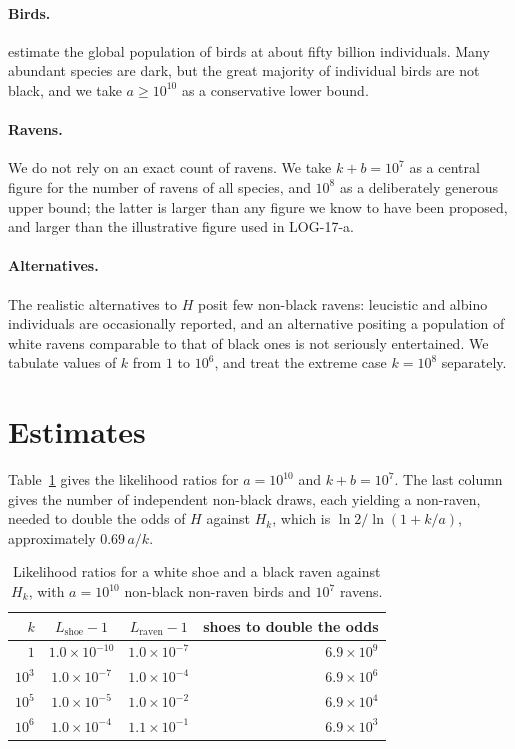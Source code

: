 \documentclass{situationist-preprint}
\begin{document}
\paragraph{Birds.} \citet{Callaghan2021} estimate the global population of birds at about fifty billion individuals. Many abundant species are dark, but the great majority of individual birds are not black, and we take $a \geq 10^{10}$ as a conservative lower bound.

\paragraph{Ravens.} We do not rely on an exact count of ravens. We take $k + b = 10^7$ as a central figure for the number of ravens of all species, and $10^8$ as a deliberately generous upper bound; the latter is larger than any figure we know to have been proposed, and larger than the illustrative figure used in LOG-17-a.

\paragraph{Alternatives.} The realistic alternatives to $H$ posit few non-black ravens: leucistic and albino individuals are occasionally reported, and an alternative positing a population of white ravens comparable to that of black ones is not seriously entertained. We tabulate values of $k$ from $1$ to $10^6$, and treat the extreme case $k = 10^8$ separately.

\section{Estimates}

Table~\ref{tab:lr} gives the likelihood ratios for $a = 10^{10}$ and $k + b = 10^7$. The last column gives the number of independent non-black draws, each yielding a non-raven, needed to double the odds of $H$ against $H_k$, which is $\ln 2 / \ln(1 + k/a)$, approximately $0.69\, a/k$.

\begin{table}[h]
\centering\small
\begin{tabular}{rccr}
\toprule
$k$ & $L_{\mathrm{shoe}} - 1$ & $L_{\mathrm{raven}} - 1$ & shoes to double the odds \\
\midrule
$1$ & $1.0 \times 10^{-10}$ & $1.0 \times 10^{-7}$ & $6.9 \times 10^{9}$ \\
$10^{3}$ & $1.0 \times 10^{-7}$ & $1.0 \times 10^{-4}$ & $6.9 \times 10^{6}$ \\
$10^{5}$ & $1.0 \times 10^{-5}$ & $1.0 \times 10^{-2}$ & $6.9 \times 10^{4}$ \\
$10^{6}$ & $1.0 \times 10^{-4}$ & $1.1 \times 10^{-1}$ & $6.9 \times 10^{3}$ \\
\bottomrule
\end{tabular}
\caption{Likelihood ratios for a white shoe and a black raven against $H_k$, with $a = 10^{10}$ non-black non-raven birds and $10^7$ ravens.}\label{tab:lr}
\end{table}
\end{document}
